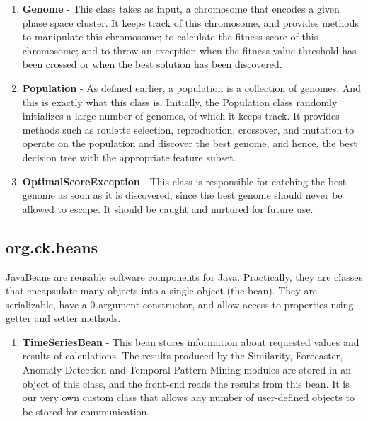 \documentclass[12pt,a4paper]{report}
\begin{document}
\begin{enumerate}
\item{\textbf{Genome} - This class takes as input, a chromosome that encodes a given phase space cluster. It keeps track of this chromosome, and provides methods to manipulate
this chromosome; to calculate the fitness score of this chromosome; and to throw an
exception when the fitness value threshold has been crossed or when the best solution has been discovered.}


\item{\textbf{Population} - As defined earlier, a population is a collection of genomes. And this is
exactly what this class is. Initially, the Population class randomly initializes a large
number of genomes, of which it keeps track. It provides methods such as roulette
selection, reproduction, crossover, and mutation to operate on the population and
discover the best genome, and hence, the best decision tree with the appropriate
feature subset.}


\item{\textbf{OptimalScoreException} - This class is responsible for catching the best genome
as soon as it is discovered, since the best genome should never be allowed to escape.
It should be caught and nurtured for future use.}

\end{enumerate}

\subsection{org.ck.beans}

JavaBeans are reusable software components for Java. Practically, they are classes that encapsulate many objects into a single object (the bean). They are serializable, have a 0-argument constructor, and allow access to properties using getter and setter methods.

\begin{enumerate}

\item{\textbf{TimeSeriesBean} - This bean stores information about requested values and results of calculations. The results produced by the Similarity, Forecaster, Anomaly Detection and Temporal Pattern Mining modules are stored in an object of this class, and the front-end reads the results from this bean. It is our very own custom class that allows any number of user-defined objects to be stored for communication.}

\end{enumerate}
\end{document}

